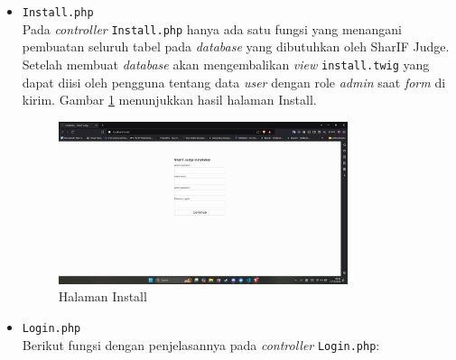 \documentclass[a4paper,twoside]{article}
\begin{document}
\begin{enumerate}
\begin{itemize}
\begin{itemize}
\begin{itemize}
			                  \end{itemize}

			            \item \verb|Install.php| \\
			                  Pada \textit{controller} \verb|Install.php| hanya ada satu fungsi yang menangani pembuatan seluruh tabel pada \textit{database} yang dibutuhkan oleh SharIF Judge. Setelah membuat \textit{database} akan mengembalikan \textit{view} \verb|install.twig| yang dapat diisi oleh pengguna tentang data \textit{user} dengan role \textit{admin} saat \textit{form} di kirim. Gambar \ref{fig:3:1:1:install} menunjukkan hasil halaman Install.

			                  \begin{figure}[H]
				                  \centering
				                  \includegraphics[width=0.8\textwidth]{views/install.png}
				                  \caption{Halaman Install}
				                  \label{fig:3:1:1:install}
			                  \end{figure}


			            \item \verb|Login.php| \\
			                  Berikut fungsi dengan penjelasannya pada \textit{controller} \verb|Login.php|:


\end{itemize}
\end{itemize}
\end{enumerate}
\end{document}
